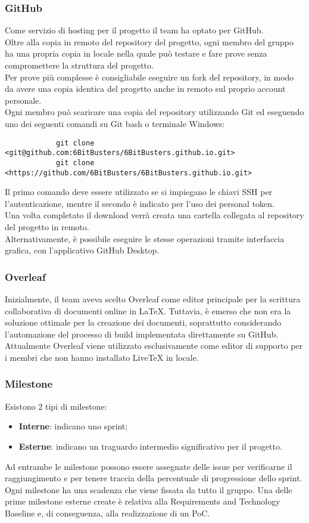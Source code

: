 \subsubsection{GitHub}
Come servizio di hosting per il progetto il team ha optato per GitHub. \\Oltre
alla copia in remoto del repository del progetto, ogni membro del gruppo ha
una propria copia in locale nella quale può testare e fare prove senza
compromettere la struttura del progetto. \\Per prove più complesse è
consigliabile eseguire un fork del repository, in modo da avere una copia
identica del progetto anche in remoto sul proprio account personale.\\ 
Ogni membro può scaricare una copia del repository utilizzando Git ed
eseguendo uno dei seguenti comandi su Git bash o terminale Windows:
\begin{verbatim}
            git clone <git@github.com:6BitBusters/6BitBusters.github.io.git>
            git clone <https://github.com/6BitBusters/6BitBusters.github.io.git>
        \end{verbatim}
Il primo comando deve essere utilizzato se si impiegano le chiavi SSH per l'autenticazione, 
mentre il secondo è indicato per l'uso dei personal token.\\ Una volta completato il download verrà creata una cartella
collegata al repository del progetto in remoto.\\ Alternativamente, è possibile
eseguire le stesse operazioni tramite interfaccia grafica, con l'applicativo
GitHub Desktop.

\subsubsection{Overleaf}
Inizialmente, il team aveva scelto Overleaf come editor principale per la scrittura collaborativa di documenti online in LaTeX. 
Tuttavia, è emerso che non era la soluzione ottimale per la creazione dei documenti, soprattutto considerando l'automazione del processo di build implementata direttamente su GitHub. 
Attualmente Overleaf viene utilizzato esclusivamente come editor di supporto per i membri che non hanno installato LiveTeX in locale.

\subsubsection{Milestone}
Esistono 2 tipi di milestone:
\begin{itemize}
    \item \textbf{Interne}: indicano uno sprint;
    \item \textbf{Esterne}: indicano un traguardo intermedio significativo per il progetto.
\end{itemize}
Ad entrambe le milestone possono essere assegnate delle issue per verificarne il raggiungimento e per tenere traccia
della percentuale di progressione dello sprint.
Ogni milestone ha una scadenza che viene fissata da tutto il gruppo. Una delle prime milestone esterne create è
relativa alla Requirements and Technology Baseline e, di conseguenza, alla realizzazione di un PoC.

